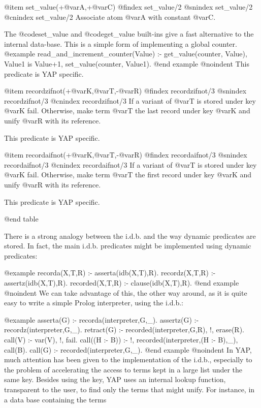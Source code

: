 {{{{{@item set_value(+@var{A},+@var{C})
@findex set_value/2 
@snindex set_value/2 
@cnindex set_value/2 
Associate atom @var{A} with constant @var{C}.

The @code{set_value} and @code{get_value} built-ins give a fast alternative to
the internal data-base. This is a simple form of implementing a global
counter.
@example
       read_and_increment_counter(Value) :-
                get_value(counter, Value),
                Value1 is Value+1,
                set_value(counter, Value1).
@end example
@noindent
This predicate is YAP specific.

@item recordzifnot(+@var{K},@var{T},-@var{R})
@findex recordzifnot/3
@snindex recordzifnot/3
@cnindex recordzifnot/3
If a variant of @var{T} is stored under key @var{K} fail. Otherwise, make
term @var{T} the last record under key @var{K} and unify @var{R} with its
reference.

This predicate is YAP specific.

@item recordaifnot(+@var{K},@var{T},-@var{R})
@findex recordaifnot/3
@snindex recordaifnot/3
@cnindex recordaifnot/3
If a variant of @var{T} is stored under key @var{K} fail. Otherwise, make
term @var{T} the first record under key @var{K} and unify @var{R} with its
reference.

This predicate is YAP specific.

@end table

There is a strong analogy between the i.d.b. and the way dynamic 
predicates are stored. In fact, the main i.d.b. predicates might be 
implemented using dynamic predicates:

@example
recorda(X,T,R) :- asserta(idb(X,T),R).
recordz(X,T,R) :- assertz(idb(X,T),R).
recorded(X,T,R) :- clause(idb(X,T),R).
@end example
@noindent
 We can take advantage of this, the other way around, as it is quite 
easy to write a simple Prolog interpreter, using the i.d.b.:

@example
asserta(G) :- recorda(interpreter,G,_).
assertz(G) :- recordz(interpreter,G,_).
retract(G) :- recorded(interpreter,G,R), !, erase(R).
call(V) :- var(V), !, fail.
call((H :- B)) :- !, recorded(interpreter,(H :- B),_), call(B).
call(G) :- recorded(interpreter,G,_).
@end example
@noindent
In YAP, much attention has been given to the implementation of the 
i.d.b., especially to the problem of accelerating the access to terms kept in 
a large list under the same key. Besides using the key, YAP uses an internal 
lookup function, transparent to the user, to find only the terms that might 
unify. For instance, in a data base containing the terms

}}}}}
